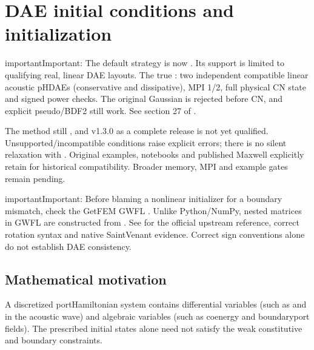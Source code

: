 \documentclass[letterpaper,10pt,english]{sphinxmanual}
\begin{document}
\section{DAE initial conditions and initialization}
\label{\detokenize{initialization:dae-initial-conditions-and-initialization}}\label{\detokenize{initialization::doc}}
\begin{sphinxadmonition}{important}{Important:}
\sphinxAtStartPar
{}
The default strategy is now  .
Its support is limited to qualifying real, linear DAE layouts.
The true : two independent compatible linear acoustic pH\sphinxhyphen{}DAEs
(conservative and dissipative), MPI 1/2, full physical CN state
and signed power checks. The original Gaussian is rejected
before CN, and explicit pseudo/BDF2 still work. See section 27
of .

\sphinxAtStartPar
The method still , and
v1.3.0 as a complete release is not yet qualified.
Unsupported/incompatible conditions raise explicit errors;
there is no silent relaxation with .
Original examples, notebooks and published Maxwell explicitly
retain  for historical compatibility. Broader
memory, MPI and example gates remain pending.
\end{sphinxadmonition}

\begin{sphinxadmonition}{important}{Important:}
\sphinxAtStartPar
Before blaming a nonlinear initializer for a boundary mismatch,
check the GetFEM GWFL . Unlike Python/NumPy,
nested matrices in GWFL are constructed from .
See {\hyperref[\detokenize{getfem_gwfl::doc}]{}} for the official upstream reference,
correct rotation syntax and native Saint\sphinxhyphen{}Venant evidence.
Correct sign conventions alone do not establish DAE consistency.
\end{sphinxadmonition}


\subsection{Mathematical motivation}
\label{\detokenize{initialization:mathematical-motivation}}
\sphinxAtStartPar
A discretized port\sphinxhyphen{}Hamiltonian system contains differential
variables (such as  and  in the acoustic wave) and
algebraic variables (such as coenergy and boundary\sphinxhyphen{}port fields).
The prescribed initial states alone need not satisfy the
weak constitutive and boundary constraints.
\end{document}
